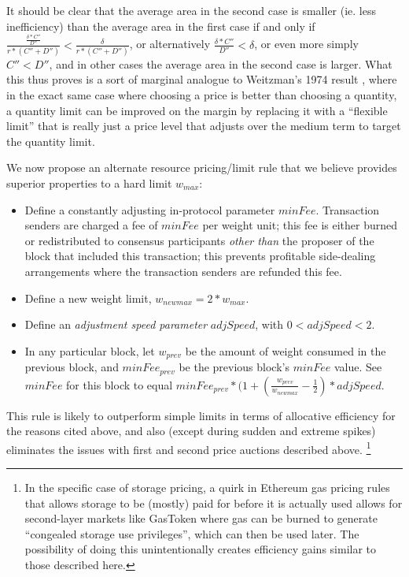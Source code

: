 \documentclass[12pt, final]{article}
\begin{document}
It should be clear that the average area in the second case is smaller (ie. less inefficiency) than the average area in the first case if and only if $\frac{\frac{\delta * C''}{D''}}{r * (C'' + D'')} < \frac{\delta}{r * (C'' + D'')}$, or alternatively $\frac{\delta * C''}{D''} < \delta$, or even more simply $C'' < D''$, and in other cases the average area in the second case is larger. What this thus proves is a sort of marginal analogue to Weitzman's 1974 result \cite{weitzman1974prices}, where in the exact same case where choosing a price is better than choosing a quantity, a quantity limit can be improved on the margin by replacing it with a ``flexible limit'' that is really just a price level that adjusts over the medium term to target the quantity limit.

We now propose an alternate resource pricing/limit rule that we believe provides superior properties to a hard limit $w_{max}$:

\begin{itemize}
\item Define a constantly adjusting in-protocol parameter $minFee$. Transaction senders are charged a fee of $minFee$ per weight unit; this fee is either burned or redistributed to consensus participants \emph{other than} the proposer of the block that included this transaction; this prevents profitable side-dealing arrangements where the transaction senders are refunded this fee.
\item Define a new weight limit, $w_{newmax} = 2 * w_{max}$.
\item Define an \emph{adjustment speed parameter} $adjSpeed$, with $0 < adjSpeed < 2$.
\item In any particular block, let $w_{prev}$ be the amount of weight consumed in the previous block, and $minFee_{prev}$ be the previous block's $minFee$ value. See $minFee$ for this block to equal $minFee_{prev} * (1 + (\frac{w_{prev}}{w_{newmax}} - \frac{1}{2}) * adjSpeed$.
\end{itemize}

This rule is likely to outperform simple limits in terms of allocative efficiency for the reasons cited above, and also (except during sudden and extreme spikes) eliminates the issues with first and second price auctions described above. \footnote{In the specific case of storage pricing, a quirk in Ethereum gas pricing rules that allows storage to be (mostly) paid for before it is actually used allows for second-layer markets like GasToken\cite{GasToken} where gas can be burned to generate ``congealed storage use privileges'', which can then be used later. The possibility of doing this unintentionally creates efficiency gains similar to those described here.}
\end{document}
